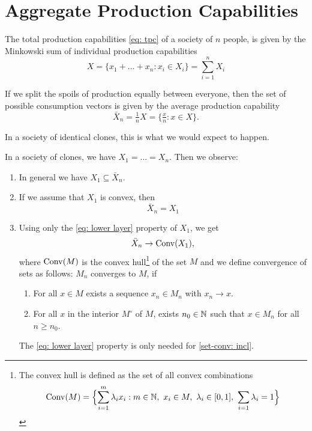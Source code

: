 \section{Aggregate Production Capabilities}

The total production capabilities \eqref{eq: tpc} of a society of \(n\) people, is given by the
Minkowski sum of individual production capabilities
\begin{equation}
	\label{eq: tpc}\tag{TPC}
	X = \{ x_1 + \dots + x_n : x_i \in X_i\} = \sum_{i=1}^n X_i
\end{equation}

If we split the spoils of production equally between everyone, then the set of
possible consumption vectors is given by the average production capability
\begin{equation}
	\label{eq: apc}\tag{APC}
	\bar{X}_n = \tfrac1n X = \{\tfrac{x}n : x\in X\}.
\end{equation}

In a society of identical clones, this is what we would expect to happen.

\begin{lemma}
	In a society of clones, we have \(X_1=\dots = X_n\). Then we observe:
	\begin{enumerate}
		\item In general we have \(X_1\subseteq \bar{X}_n\).
		\item If we assume that \(X_1\) is convex, then
		\[
			\bar{X}_n = X_1
		\]
		\item Using only the \ref{eq: lower layer} property of \(X_1\), we get
		\[
			\bar{X}_n \to \operatorname{Conv}(X_1),
		\]
		where \(\operatorname{Conv}(M)\) is the convex hull\footnote{
			The convex hull is defined as the set of all convex combinations
			\[
				\conv(M)= \Bigl\{\sum_{i=1}^m \lambda_i x_i : m\in\nat,\ x_i \in M,\ \lambda_i\in[0,1],\ \sum_{i=1}\lambda_i =1\Bigr\}
			\]
		} of the set \(M\) and we define
		convergence of sets as follows: \(M_n\) converges to \(M\), if

		\begin{enumerate}
			\item\label{set-conv: seq} For all \(x\in M\) exists a sequence
			\(x_n\in M_n\) with \(x_n\to x\).

			\item\label{set-conv: incl} For all \(x\) in the interior \(M^\circ\)
			of \(M\), exists \(n_0\in\mathbb{N}\) such that \(x\in M_n\) for all \(n\ge
			n_0\).
		\end{enumerate}
		The \ref{eq: lower layer} property is only needed for \ref{set-conv:
		incl}.
	\end{enumerate}
\end{lemma}

